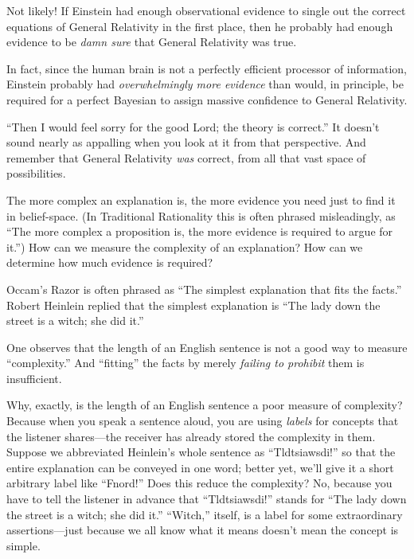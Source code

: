 {
 Not likely! If Einstein had enough observational evidence to
single out the correct equations of General Relativity in the first
place, then he probably had enough evidence to be \textit{damn sure}
that General Relativity was true.}

{
 In fact, since the human brain is not a perfectly efficient
processor of information, Einstein probably had \textit{overwhelmingly
more evidence} than would, in principle, be required for a perfect
Bayesian to assign massive confidence to General Relativity.}

{
 ``Then I would feel sorry for the good Lord; the
theory is correct.'' It doesn't sound
nearly as appalling when you look at it from that perspective. And
remember that General Relativity \textit{was} correct, from all that
vast space of possibilities.}

\myendsectiontext

\label{occams_razor}

{
 The more complex an explanation is, the more evidence you need
just to find it in belief-space. (In Traditional Rationality this is
often phrased misleadingly, as ``The more complex a
proposition is, the more evidence is required to argue for
it.'') How can we measure the complexity of an
explanation? How can we determine how much evidence is required? }

{
 Occam's Razor is often phrased as
``The simplest explanation that fits the
facts.'' Robert Heinlein replied that the simplest
explanation is ``The lady down the street is a witch;
she did it.''}

{
 One observes that the length of an English sentence is not a good
way to measure ``complexity.'' And
``fitting'' the facts by merely
\textit{failing to prohibit} them is insufficient.}

{
 Why, exactly, is the length of an English sentence a poor measure
of complexity? Because when you speak a sentence aloud, you are using
\textit{labels} for concepts that the listener shares---the receiver
has already stored the complexity in them. Suppose we abbreviated
Heinlein's whole sentence as
``Tldtsiawsdi!'' so that the entire
explanation can be conveyed in one word; better yet,
we'll give it a short arbitrary label like
``Fnord!'' Does this reduce the
complexity? No, because you have to tell the listener in advance that
``Tldtsiawsdi!'' stands for
``The lady down the street is a witch; she did
it.'' ``Witch,''
itself, is a label for some extraordinary assertions---just because we
all know what it means doesn't mean the concept is
simple.}


